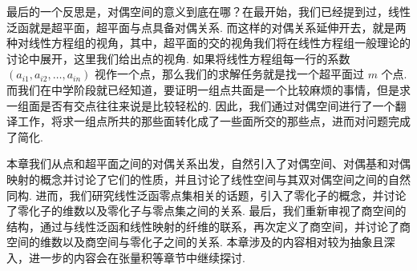 最后的一个反思是，对偶空间的意义到底在哪？在最开始，我们已经提到过，线性泛函就是超平面，超平面与点具备对偶关系. 而这样的对偶关系延伸开去，就是两种对线性方程组的视角，其中，超平面的交的视角我们将在线性方程组一般理论的讨论中展开，这里我们给出点的视角. 如果将线性方程组每一行的系数 $(a_{i1}, a_{i2},\ldots, a_{in})$ 视作一个点，那么我们的求解任务就是找一个超平面过 $m$ 个点. 而我们在中学阶段就已经知道，要证明一组点共面是一个比较麻烦的事情，但是求一组面是否有交点往往来说是比较轻松的. 因此，我们通过对偶空间进行了一个翻译工作，将求一组点所共的那些面转化成了一些面所交的那些点，进而对问题完成了简化.

\begin{summary}
    本章我们从点和超平面之间的对偶关系出发，自然引入了对偶空间、对偶基和对偶映射的概念并讨论了它们的性质，并且讨论了线性空间与其双对偶空间之间的自然同构. 进而，我们研究线性泛函零点集相关的话题，引入了零化子的概念，并讨论了零化子的维数以及零化子与零点集之间的关系. 最后，我们重新审视了商空间的结构，通过与线性泛函和线性映射的纤维的联系，再次定义了商空间，并讨论了商空间的维数以及商空间与零化子之间的关系. 本章涉及的内容相对较为抽象且深入，进一步的内容会在张量积等章节中继续探讨.
\end{summary}

